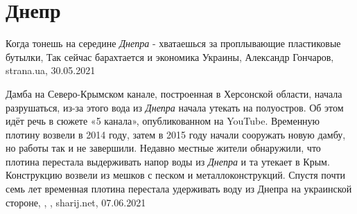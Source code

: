  
 
 
 
 
\chapter{Днепр}

Когда тонешь на середине \emph{Днепра} - хватаешься за проплывающие пластиковые
бутылки, Так сейчас барахтается и экономика Украины, Александр Гончаров,
strana.ua, 30.05.2021

Дамба на Северо-Крымском канале, построенная в Херсонской области, начала
разрушаться, из-за этого вода из \emph{Днепра} начала утекать на полуостров. Об
этом идёт речь в сюжете «5 канала», опубликованном на YouTube. Временную
плотину возвели в 2014 году, затем в 2015 году начали сооружать новую дамбу, но
работы так и не завершили. Недавно местные жители обнаружили, что плотина
перестала выдерживать напор воды из \emph{Днепра} и та утекает в Крым.
Конструкцию возвели из мешков с песком и металлоконструкций. Спустя почти семь
лет временная плотина перестала удерживать воду из Днепра на украинской
стороне,
, , sharij.net, 07.06.2021

